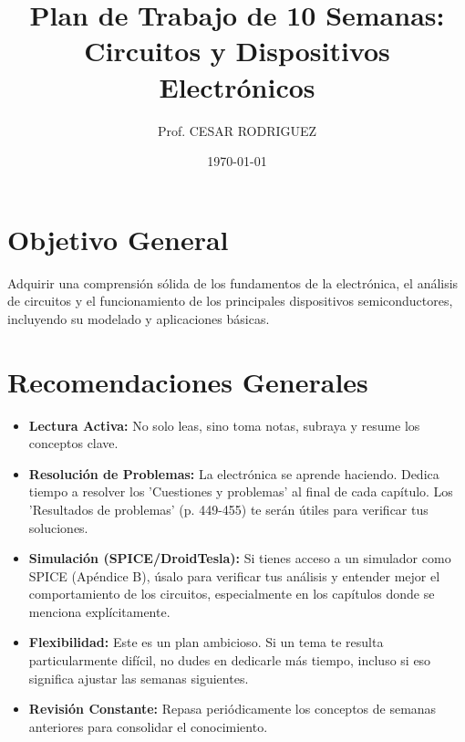 \documentclass[12pt,a4paper]{article}
\title{Plan de Trabajo de 10 Semanas: Circuitos y Dispositivos Electrónicos}
\author{Prof. CESAR RODRIGUEZ}
\date{\today}
\begin{document}
\maketitle

\section*{Objetivo General}
Adquirir una comprensión sólida de los fundamentos de la electrónica, el análisis de circuitos y el funcionamiento de los principales dispositivos semiconductores, incluyendo su modelado y aplicaciones básicas.

\section*{Recomendaciones Generales}
\begin{itemize}
    \item \textbf{Lectura Activa:} No solo leas, sino toma notas, subraya y resume los 
    conceptos clave.
    \item \textbf{Resolución de Problemas:} La electrónica se aprende haciendo. Dedica 
    tiempo a resolver los 'Cuestiones y problemas' al final de cada capítulo. Los 
    'Resultados de problemas' (p. 449-455) te serán útiles para verificar tus soluciones.
    \item \textbf{Simulación (SPICE/DroidTesla):} Si tienes acceso a un simulador como SPICE 
    (Apéndice B), úsalo para verificar tus análisis y entender mejor el comportamiento de 
    los circuitos, especialmente en los capítulos donde se menciona explícitamente.
    \item \textbf{Flexibilidad:} Este es un plan ambicioso. Si un tema te resulta 
    particularmente difícil, no dudes en dedicarle más tiempo, incluso si eso significa 
    ajustar las semanas siguientes.
    \item \textbf{Revisión Constante:} Repasa periódicamente los conceptos de semanas 
    anteriores para consolidar el conocimiento.
\end{itemize}

\hrulefill
\vspace{1cm}
\end{document}
